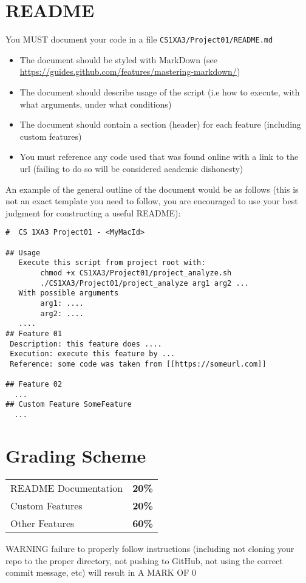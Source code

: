 \documentclass[11pt]{article}
\begin{document}
\newpage

\section{README}
\label{sec:orged667f8}
You {\color{purple}MUST} document your code in a file \texttt{CS1XA3/Project01/README.md}
\begin{itemize}
\item The document should be styled with {\color{purple}MarkDown} (see
{\color{cyan}\url{https://guides.github.com/features/mastering-markdown/}})
\item The document should describe usage of the script (i.e how to execute, with what arguments, under what conditions)
\item The document should contain a section (header) for each feature (including custom features)
\item You must reference any code used that was found online with a link to the
url (failing to do so will be considered academic dishonesty)
\end{itemize}
An example of the general outline of the document would be as follows (this is
not an exact template you need to follow, you are encouraged to use your best
judgment for constructing a useful README):


\begin{verbatim}
#  CS 1XA3 Project01 - <MyMacId>

## Usage
   Execute this script from project root with:
        chmod +x CS1XA3/Project01/project_analyze.sh
        ./CS1XA3/Project01/project_analyze arg1 arg2 ...
   With possible arguments
        arg1: ....
        arg2: ....
   ....
## Feature 01
 Description: this feature does ....
 Execution: execute this feature by ...
 Reference: some code was taken from [[https://someurl.com]]

## Feature 02
  ...
## Custom Feature SomeFeature
  ...
\end{verbatim}

\newpage

\section{Grading Scheme}
\label{sec:orgfe72720}
\begin{center}
\begin{tabular}{ll}
README Documentation & \textbf{20\%}\\
Custom Features & \textbf{20\%}\\
Other Features & \textbf{60\%}\\
\end{tabular}
\end{center}
{\color{red}WARNING} failure to properly follow instructions (including not cloning
 your repo to the proper directory, not pushing to GitHub, not using the
 correct commit message, etc) will result in {\color{purple}A MARK OF 0}
\end{document}
